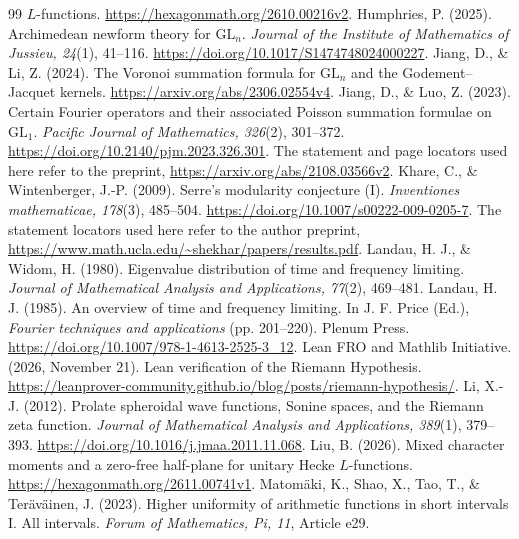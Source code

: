 \begin{thebibliography}{99}
$L$-functions. \url{https://hexagonmath.org/2610.00216v2}.
Humphries, P. (2025). Archimedean newform theory for $\mathrm{GL}_n$.
\emph{Journal of the Institute of Mathematics of Jussieu, 24}(1), 41--116.
\url{https://doi.org/10.1017/S1474748024000227}.
Jiang, D., \& Li, Z. (2024). The Voronoi summation formula for
$\mathrm{GL}_n$ and the Godement--Jacquet kernels.
\url{https://arxiv.org/abs/2306.02554v4}.
Jiang, D., \& Luo, Z. (2023). Certain Fourier operators and their
associated Poisson summation formulae on $\mathrm{GL}_1$.
\emph{Pacific Journal of Mathematics, 326}(2), 301--372.
\url{https://doi.org/10.2140/pjm.2023.326.301}.
The statement and page locators used here refer to the preprint,
\url{https://arxiv.org/abs/2108.03566v2}.
Khare, C., \& Wintenberger, J.-P. (2009).
Serre's modularity conjecture (I).
\emph{Inventiones mathematicae, 178}(3), 485--504.
\url{https://doi.org/10.1007/s00222-009-0205-7}.
The statement locators used here refer to the author preprint,
\url{https://www.math.ucla.edu/~shekhar/papers/results.pdf}.
Landau, H. J., \& Widom, H. (1980). Eigenvalue distribution of time
and frequency limiting. \emph{Journal of Mathematical Analysis and
Applications, 77}(2), 469--481.
Landau, H. J. (1985). An overview of time and frequency limiting.
In J. F. Price (Ed.), \emph{Fourier techniques and applications}
(pp. 201--220). Plenum Press.
\url{https://doi.org/10.1007/978-1-4613-2525-3_12}.
Lean FRO and Mathlib Initiative. (2026, November 21).
Lean verification of the Riemann Hypothesis.
\url{https://leanprover-community.github.io/blog/posts/riemann-hypothesis/}.
Li, X.-J. (2012). Prolate spheroidal wave functions, Sonine spaces,
and the Riemann zeta function. \emph{Journal of Mathematical Analysis
and Applications, 389}(1), 379--393.
\url{https://doi.org/10.1016/j.jmaa.2011.11.068}.
Liu, B. (2026). Mixed character moments and a zero-free half-plane
for unitary Hecke $L$-functions. \url{https://hexagonmath.org/2611.00741v1}.
Matom\"aki, K., Shao, X., Tao, T., \& Ter\"av\"ainen, J. (2023).
Higher uniformity of arithmetic functions in short intervals I.
All intervals. \emph{Forum of Mathematics, Pi, 11}, Article e29.

\end{thebibliography}
